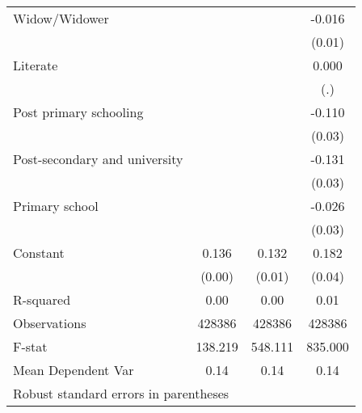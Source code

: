 {\begin{tabular}{l*{3}{c}}
Widow/Widower       &                     &                     &      -0.016         \\
                    &                     &                     &      (0.01)         \\
Literate            &                     &                     &       0.000         \\
                    &                     &                     &         (.)         \\
Post primary schooling&                     &                     &      -0.110\sym{***}\\
                    &                     &                     &      (0.03)         \\
Post-secondary and university&                     &                     &      -0.131\sym{***}\\
                    &                     &                     &      (0.03)         \\
Primary school      &                     &                     &      -0.026         \\
                    &                     &                     &      (0.03)         \\
Constant            &       0.136\sym{***}&       0.132\sym{***}&       0.182\sym{***}\\
                    &      (0.00)         &      (0.01)         &      (0.04)         \\
\hline
R-squared           &        0.00         &        0.00         &        0.01         \\
Observations        &      428386         &      428386         &      428386         \\
F-stat              &     138.219         &     548.111         &     835.000         \\
Mean Dependent Var  &        0.14         &        0.14         &        0.14         \\
\hline\hline
\multicolumn{4}{l}{\footnotesize Robust standard errors in parentheses}\\
\end{tabular}
}
